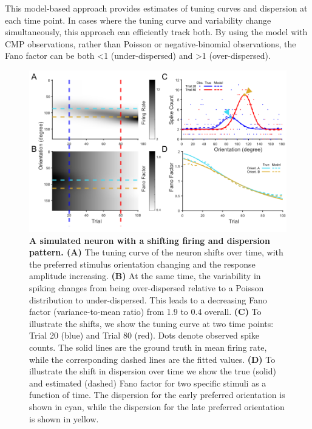 \documentclass[]{article}
\begin{document}
	This model-based approach provides estimates of tuning curves and dispersion at each time point. In cases where the tuning curve and variability change simultaneously, this approach can efficiently track both. By using the model with CMP observations, rather than Poisson or negative-binomial observations, the Fano factor can be both <1 (under-dispersed) and >1 (over-dispersed).
	
	\begin{figure}[h!]
		\centering
		\includegraphics[width=1\textwidth]{figure1.png}
		\caption{\textbf{A simulated neuron with a shifting firing and dispersion pattern. (A)} The tuning curve of the neuron shifts over time, with the preferred stimulus orientation changing and the response amplitude increasing. \textbf{(B)} At the same time, the variability in spiking changes from being over-dispersed relative to a Poisson distribution to under-dispersed. This leads to a decreasing Fano factor (variance-to-mean ratio) from 1.9 to 0.4 overall. \textbf{(C)} To illustrate the shifts, we show the tuning curve at two time points: Trial 20 (blue) and Trial 80 (red). Dots denote observed spike counts. The solid lines are the ground truth in mean firing rate, while the corresponding dashed lines are the fitted values. \textbf{(D)} To illustrate the shift in dispersion over time we show the true (solid) and estimated (dashed) Fano factor for two specific stimuli as a function of time. The dispersion for the early preferred orientation is shown in cyan, while the dispersion for the late preferred orientation is shown in yellow.}
		\label{fig1}
	\end{figure}
	
\end{document}
